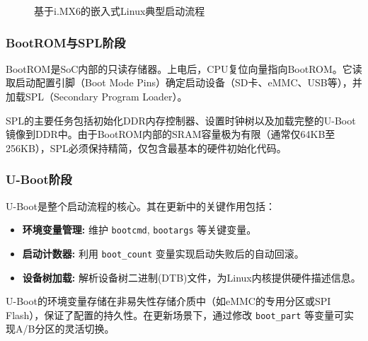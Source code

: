 \documentclass[a4paper,12pt]{article}
\begin{document}
\begin{figure}[H]
\centering
{}
\caption{基于i.MX6的嵌入式Linux典型启动流程}
\label{fig:boot_flow}
\end{figure}

\subsubsection{BootROM与SPL阶段}
BootROM是SoC内部的只读存储器。上电后，CPU复位向量指向BootROM。它读取启动配置引脚（Boot Mode Pins）确定启动设备（SD卡、eMMC、USB等），并加载SPL（Secondary Program Loader）。

SPL的主要任务包括初始化DDR内存控制器、设置时钟树以及加载完整的U-Boot镜像到DDR中。由于BootROM内部的SRAM容量极为有限（通常仅64KB至256KB），SPL必须保持精简，仅包含最基本的硬件初始化代码。

\subsubsection{U-Boot阶段}
U-Boot是整个启动流程的核心。其在更新中的关键作用包括：
\begin{itemize}
    \item \textbf{环境变量管理:} 维护 \texttt{bootcmd}, \texttt{bootargs} 等关键变量。
    \item \textbf{启动计数器:} 利用 \texttt{boot\_count} 变量实现启动失败后的自动回滚。
    \item \textbf{设备树加载:} 解析设备树二进制(DTB)文件，为Linux内核提供硬件描述信息。
\end{itemize}

U-Boot的环境变量存储在非易失性存储介质中（如eMMC的专用分区或SPI Flash），保证了配置的持久性。在更新场景下，通过修改 \texttt{boot\_part} 等变量可实现A/B分区的灵活切换。
\end{document}
